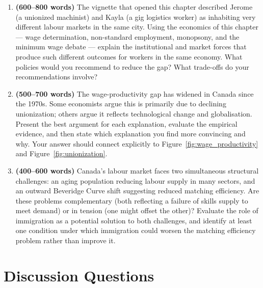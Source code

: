 \begin{enumerate}

\item \textbf{(600--800 words)} The vignette that opened this chapter
described Jerome (a unionized machinist) and Kayla (a gig logistics worker)
as inhabiting very different labour markets in the same city. Using the
economics of this chapter --- wage determination, non-standard employment,
monopsony, and the minimum wage debate --- explain the institutional and
market forces that produce such different outcomes for workers in the same
economy. What policies would you recommend to reduce the gap? What trade-offs
do your recommendations involve?

\item \textbf{(500--700 words)} The wage-productivity gap has widened in
Canada since the 1970s. Some economists argue this is primarily due to
declining unionization; others argue it reflects technological change and
globalisation. Present the best argument for each explanation, evaluate the
empirical evidence, and then state which explanation you find more convincing
and why. Your answer should connect explicitly to Figure~\ref{fig:wage_productivity}
and Figure~\ref{fig:unionization}.

\item \textbf{(400--600 words)} Canada's labour market faces two simultaneous
structural challenges: an aging population reducing labour supply in many
sectors, and an outward Beveridge Curve shift suggesting reduced matching
efficiency. Are these problems complementary (both reflecting a failure
of skills supply to meet demand) or in tension (one might offset the other)?
Evaluate the role of immigration as a potential solution to both challenges,
and identify at least one condition under which immigration could worsen
the matching efficiency problem rather than improve it.

\end{enumerate}

\section*{Discussion Questions}

